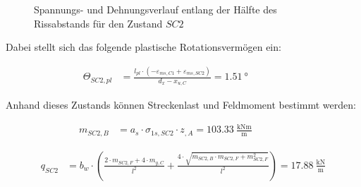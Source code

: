 \documentclass[
  11pt,
  letterpaper,
]{scrreprt}
\begin{document}
\begin{figure}[H]

\begin{minipage}{0.50\linewidth}



\end{minipage}%
%
\begin{minipage}{0.50\linewidth}



\end{minipage}%

\caption{\label{fig-jag_zustand_sc2}Spannungs- und Dehnungsverlauf
entlang der Hälfte des Rissabstands für den Zustand \(SC2\)}

\end{figure}%

Dabei stellt sich das folgende plastische Rotationsvermögen ein:

\[
\begin{aligned}
\Theta_{SC2 , pl}& = \frac{l_{pl} \cdot \left(- \varepsilon_{m s , C1} + \varepsilon_{m s , SC2}\right)}{d_{x} - x_{u , C}} = 1.51 \ \mathrm{°} \quad &  \quad &  
 \end{aligned}
\]

Anhand dieses Zustands können Streckenlast und Feldmoment bestimmt
werden:

\[
\begin{aligned}
m_{SC2 , B}& = a_{s} \cdot \sigma_{1 s , SC2} \cdot z_{, A} = 103.33 \ \frac{\mathrm{kNm}}{\mathrm{m}} \quad &  \quad &  
 \end{aligned}
\]

\[
\begin{aligned}
q_{SC2}& = b_{w} \cdot \left(\frac{2 \cdot m_{SC2 , F} + 4 \cdot m_{y , C}}{l^{2}} + \frac{4 \cdot \sqrt{m_{SC2 , B} \cdot m_{SC2 , F} + m_{SC2 , F}^{2}}}{l^{2}}\right) = 17.88 \ \frac{\mathrm{kN}}{\mathrm{m}} \end{aligned}
\]
\end{document}
